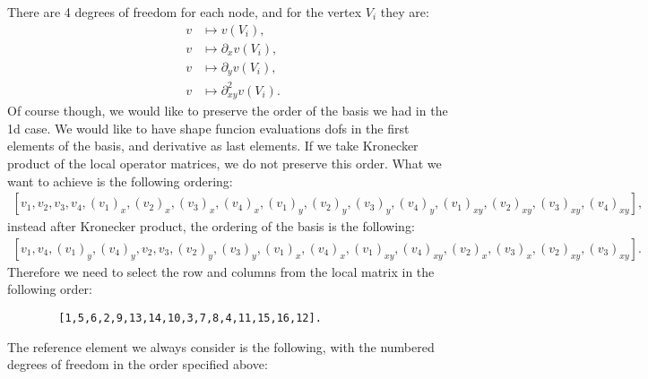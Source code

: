 \documentclass[]{report}
\begin{document}
    There are 4 degrees of freedom for each node, and for the vertex $V_i$ they are:
    \begin{align*}
        v &\mapsto v(V_i), \\
        v &\mapsto \partial_x v(V_i), \\
        v &\mapsto \partial_y v(V_i), \\
        v &\mapsto \partial^2_{xy} v(V_i).
    \end{align*}
    Of course though, we would like to preserve the order of the basis we had in the 1d case. We would like to have shape funcion evaluations dofs in the first elements of the basis, and derivative as last elements. If we take Kronecker product of the local operator matrices, we do not preserve this order.
    What we want to achieve is the following ordering:
    \begin{align*}
        \left[
            v_1, v_2, v_3, v_4,
            (v_1)_x, (v_2)_x, (v_3)_x, (v_4)_x,
            (v_1)_y, (v_2)_y, (v_3)_y, (v_4)_y,
            (v_1)_{xy}, (v_2)_{xy}, (v_3)_{xy}, (v_4)_{xy} 
            \right],
    \end{align*}
    instead after Kronecker product, the ordering of the basis is the following:
    \begin{align*}
        \left[
            v_1, v_4, (v_1)_y, (v_4)_y,
            v_2, v_3, (v_2)_y, (v_3)_y,
            (v_1)_x, (v_4)_x, (v_1)_{xy}, (v_4)_{xy},
            (v_2)_x, (v_3)_x, (v_2)_{xy}, (v_3)_{xy}
            \right].
    \end{align*}
    Therefore we need to select the row and columns from the local matrix in the following order:
    \begin{lstlisting}
        [1,5,6,2,9,13,14,10,3,7,8,4,11,15,16,12].
    \end{lstlisting}
    The reference element we always consider is the following, with the numbered degrees of freedom in the order specified above:
    \begin{center}
    \end{center}
    
\end{document}
